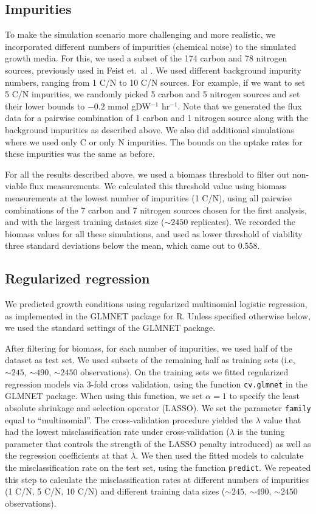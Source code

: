 \documentclass[12pt]{article}
\begin{document}
\subsection{Impurities}
To make the simulation scenario more challenging and more realistic, we incorporated different numbers of impurities (chemical noise) to the simulated growth media. For this, we used a subset of the 174 carbon and 78 nitrogen sources, previously used in Feist et.\ al \cite{Feistetal2007}.  We used different background impurity numbers, ranging from 1 C/N to 10 C/N sources. For example, if we want to set 5 C/N impurities, we randomly picked 5 carbon and 5 nitrogen sources and set their lower bounds to $-0.2$ mmol gDW$^{-1}$ hr$^{-1}$. Note that we generated the flux data for a pairwise combination of 1 carbon and 1 nitrogen source along with the background impurities as described above. We also did additional simulations where we used only C or only N impurities. The bounds on the uptake rates for these impurities was the same as before.

For all the results described above, we used a biomass threshold to filter out non-viable flux measurements. We calculated this threshold value using biomass measurements at the lowest number of impurities (1 C/N), using all pairwise combinations of the 7 carbon and 7 nitrogen sources chosen for the first analysis, and with the largest training dataset size ($\sim2450$ replicates). We recorded the biomass values for all these simulations, and used as lower threshold of viability three standard deviations below the mean, which came out to 0.558.

\subsection{Regularized regression}

We predicted growth conditions using regularized multinomial logistic regression, as implemented in the GLMNET package \cite{Friedmanetal2010} for R. Unless specified otherwise below, we used the standard settings of the GLMNET package.

After filtering for biomass, for each number of impurities, we used half of the dataset as test set. We used subsets of the remaining half as training sets (i.e, $\sim245$, $\sim490$, $\sim2450$ observations). On the training sets we fitted regularized regression models via 3-fold cross validation, using the function \texttt{cv.glmnet} in the GLMNET package. When using this function, we set $\alpha=1$ to specify the least absolute shrinkage and selection operator (LASSO). We set the parameter \texttt{family} equal to ``multinomial''. The cross-validation procedure yielded the  $\lambda$ value that had the lowest misclassification rate under cross-validation ($\lambda$ is the tuning parameter that controls the strength of the LASSO penalty introduced) as well as the regression coefficients at that $\lambda$. We then used the fitted models to calculate the misclassification rate on the test set, using the function \texttt{predict}. We repeated this step to calculate the misclassification rates at different numbers of impurities (1 C/N, 5 C/N, 10 C/N) and different training data sizes ($\sim245$, $\sim490$, $\sim2450$ observations).
\end{document}
